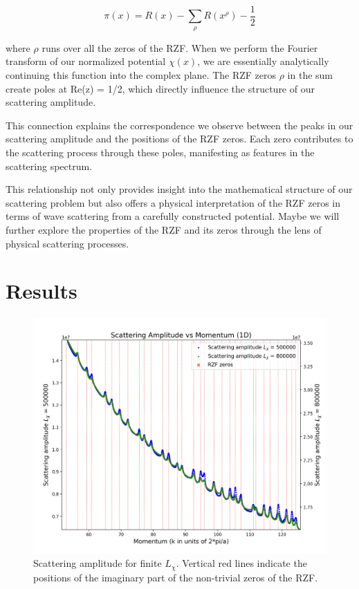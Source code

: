 \documentclass[11pt, oneside]{article}
\begin{document}
\begin{equation}
\pi(x) = R(x) - \sum_{\rho}R(x^{\rho}) - \frac{1}{2}
\end{equation}

where $\rho$ runs over all the zeros of the RZF. When we perform the Fourier transform of our normalized potential $\chi(x)$, we are essentially analytically continuing this function into the complex plane. The RZF zeros $\rho$ in the sum create poles at Re(z) = 1/2, which directly influence the structure of our scattering amplitude.

This connection explains the correspondence we observe between the peaks in our scattering amplitude and the positions of the RZF zeros. Each zero contributes to the scattering process through these poles, manifesting as features in the scattering spectrum.

This relationship not only provides insight into the mathematical structure of our scattering problem but also offers a physical interpretation of the RZF zeros in terms of wave scattering from a carefully constructed potential. Maybe we will further explore the properties of the RZF and its zeros through the lens of physical scattering processes.

\section{Results}
\begin{figure}[htbp]
\begin{center}
    \includegraphics[width=0.8\linewidth]{../images/zoomed_scattering.png}
\caption{Scattering amplitude for finite $L_{\chi}$. Vertical red lines indicate the positions of the imaginary part of the non-trivial zeros of the RZF.}
\label{fig:scattering_amplitude}
\end{center}
\end{figure}
\end{document}
